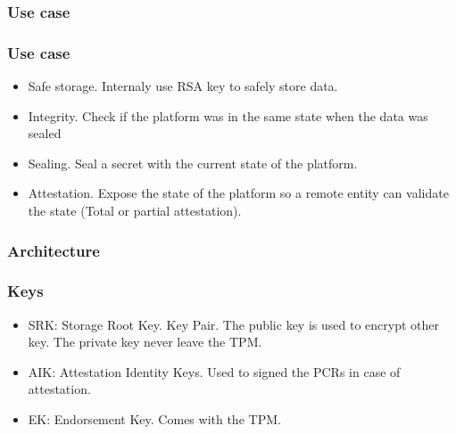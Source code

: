 \subsubsection{Use case}
        \begin{frame}
                \frametitle{Use case}
                \begin{itemize}
                        \item Safe storage. Internaly use RSA key to safely store
                        data.
                        \item Integrity. Check if the platform was in
                        the same state when the data was sealed
                        \item Sealing. Seal a secret with the current
                        state of the platform.
                        \item Attestation. Expose the state of the
                        platform so a remote entity can validate the
                        state (Total or partial attestation).
                \end{itemize}
        \end{frame}

\subsubsection{Architecture}
        \begin{frame}
                \frametitle{Keys}
                \begin{itemize}
                        \item SRK: Storage Root Key. Key Pair. The
                        public key is used to encrypt other key. The
                        private key never leave the TPM.
                        \item AIK: Attestation Identity Keys. Used to
                        signed the PCRs in case of attestation.
                        \item EK: Endorsement Key. Comes with the TPM.
                \end{itemize}
        \end{frame}

